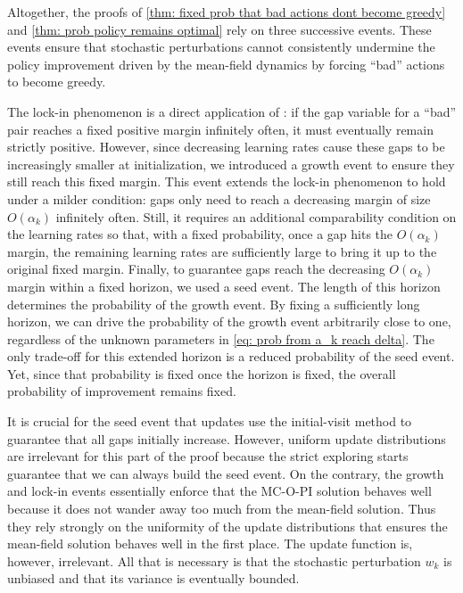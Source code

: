 Altogether, the proofs of \autoref{thm: fixed prob that bad actions dont become greedy} and \autoref{thm: prob policy remains optimal}
rely on three successive events.
These events ensure that stochastic perturbations cannot consistently
undermine the policy improvement driven by the mean-field dynamics
by forcing ``bad'' actions to become greedy.


The lock-in phenomenon is a direct application of \citep[Theorem~2.1]{Borkar2002OnApproximation}:
if the gap variable for a ``bad'' pair reaches a fixed positive margin infinitely often, 
it must eventually remain strictly positive.
However, since decreasing learning rates cause these gaps to be increasingly smaller at initialization,
we introduced a growth event to ensure they still reach this fixed margin.
This event extends the lock-in phenomenon to hold under a milder condition: gaps only need to reach a decreasing margin of size $O(\alpha_k)$ infinitely often.
Still, it requires an additional comparability condition on the learning rates so that, with a fixed probability, once a gap hits the $O(\alpha_k)$ margin, the remaining learning rates are sufficiently large to bring it up to the original fixed margin.
Finally, to guarantee gaps reach the decreasing $O(\alpha_k)$ margin within a fixed horizon, we used a seed event.
The length of this horizon determines the probability of the growth event.
By fixing a sufficiently long horizon, we can drive the probability of the growth event arbitrarily close to one, regardless of the unknown parameters in \eqref{eq: prob from a_k reach delta}.
The only trade-off for this extended horizon is a reduced probability of the seed event.
Yet, since that probability is fixed once the horizon is fixed, the overall probability of improvement remains fixed.


It is crucial for the seed event that updates use the initial-visit method to guarantee that all gaps initially increase.
However, uniform update distributions are irrelevant for this part of the proof because the strict exploring starts guarantee that we can always build the seed event.
On the contrary, the growth and lock-in events essentially enforce that the MC-O-PI solution behaves well because it does not wander away too much from the mean-field solution.
Thus they rely strongly on the uniformity of the update distributions that ensures the mean-field solution behaves well in the first place.
The update function is, however, irrelevant.
All that is necessary is that the stochastic perturbation $w_k$ is unbiased and that its variance is eventually bounded.



